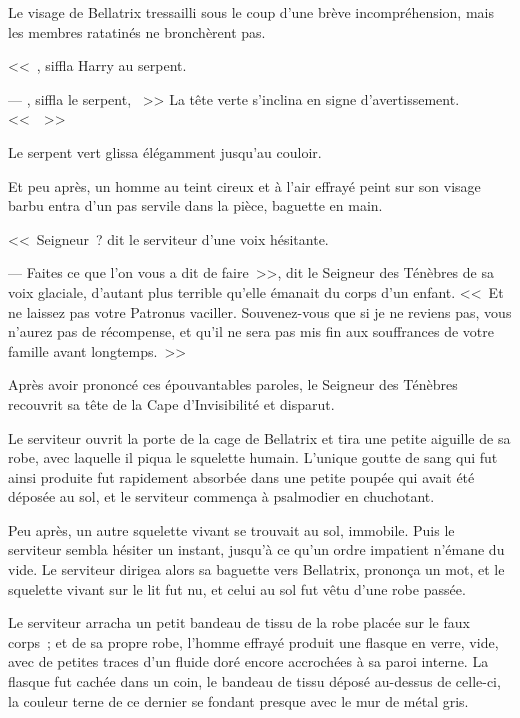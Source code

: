 Le visage de Bellatrix tressailli sous le coup d'une brève incompréhension, mais les membres ratatinés ne bronchèrent pas.

<<~, siffla Harry au serpent. 

--- , siffla le serpent, ~>> La tête verte s'inclina en signe d'avertissement. <<~~>>

Le serpent vert glissa élégamment jusqu'au couloir.

Et peu après, un homme au teint cireux et à l'air effrayé peint sur son visage barbu entra d'un pas servile dans la pièce, baguette en main.

<<~Seigneur~? dit le serviteur d'une voix hésitante.

--- Faites ce que l'on vous a dit de faire~>>, dit le Seigneur des Ténèbres de sa voix glaciale, d'autant plus terrible qu'elle émanait du corps d'un enfant. <<~Et ne laissez pas votre Patronus vaciller. Souvenez-vous que si je ne reviens pas, vous n'aurez pas de récompense, et qu'il ne sera pas mis fin aux souffrances de votre famille avant longtemps.~>>

Après avoir prononcé ces épouvantables paroles, le Seigneur des Ténèbres recouvrit sa tête de la Cape d'Invisibilité et disparut.

Le serviteur ouvrit la porte de la cage de Bellatrix et tira une petite aiguille de sa robe, avec laquelle il piqua le squelette humain. L'unique goutte de sang qui fut ainsi produite fut rapidement absorbée dans une petite poupée qui avait été déposée au sol, et le serviteur commença à psalmodier en chuchotant.

Peu après, un autre squelette vivant se trouvait au sol, immobile. Puis le serviteur sembla hésiter un instant, jusqu'à ce qu'un ordre impatient n'émane du vide. Le serviteur dirigea alors sa baguette vers Bellatrix, prononça un mot, et le squelette vivant sur le lit fut nu, et celui au sol fut vêtu d'une robe passée.

Le serviteur arracha un petit bandeau de tissu de la robe placée sur le faux corps~; et de sa propre robe, l'homme effrayé produit une flasque en verre, vide, avec de petites traces d'un fluide doré encore accrochées à sa paroi interne. La flasque fut cachée dans un coin, le bandeau de tissu déposé au-dessus de celle-ci, la couleur terne de ce dernier se fondant presque avec le mur de métal gris.

